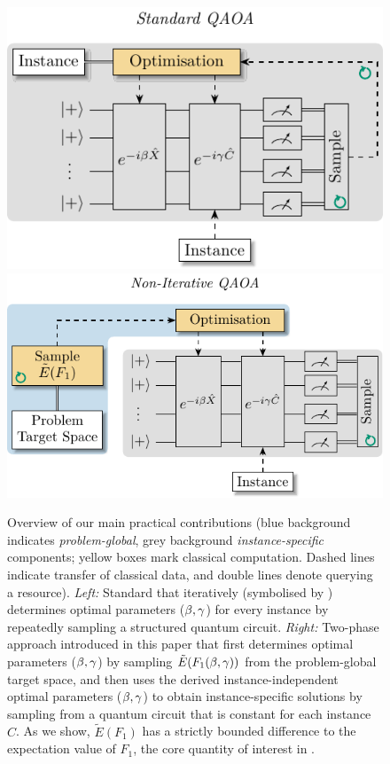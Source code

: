 \begin{figure}[htbp]
    
    \includegraphics{figures/tikz/qaoa_iterative.pdf}
    \hfill
    \includegraphics{figures/tikz/qaoa_novel.pdf}
    \caption{Overview of our main practical contributions (blue background  indicates \emph{problem-global},
    grey background  \emph{instance-specific} components; yellow boxes  mark classical computation. Dashed lines \usebox\databox{} indicate transfer of classical data, and double lines \usebox\varbox{} denote querying a resource).
    \emph{Left:} Standard \QAOA that iteratively (symbolised by \iterationnf) determines optimal parameters (\(\beta, \gamma\)) for every instance by repeatedly sampling a structured quantum circuit.
    \emph{Right:} Two-phase \QAOA approach introduced in this paper that first
    determines optimal parameters (\(\beta, \gamma\)) by sampling \(\tilde{E}(F_{1}(\beta, \gamma))\) from the problem-global target space, and then uses the derived instance-independent optimal parameters (\(\beta, \gamma\)) to obtain instance-specific solutions by sampling from a quantum circuit that is constant for each
    instance \(\hat{C}\). As we show, \(\tilde{E}(F_{1})\) has a strictly bounded difference to the expectation value of 
    \(F_{1}\), the core quantity of interest in \QAOA.
    }\label{fig:application_overview}
\end{figure}

